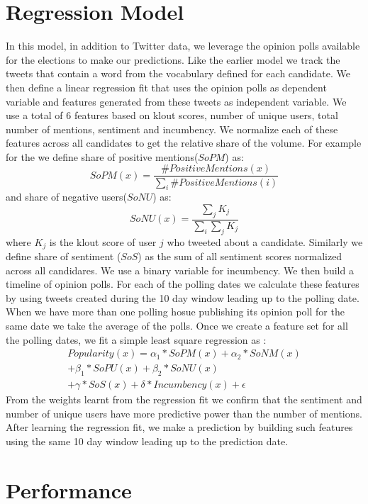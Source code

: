 \section{Regression Model}
In this model, in addition to Twitter data, we leverage the opinion polls available for the elections to make our predictions.
Like the earlier model we track the tweets that contain a word from the vocabulary defined for each candidate.
We then define a linear regression fit that uses the opinion polls as dependent variable and features generated from these tweets as independent variable.
We use a total of 6 features based on klout scores, number of unique users, total number of mentions, sentiment and incumbency.
We normalize each of these features across all candidates to get the relative share of the volume. 
For example for the we define share of positive mentions($SoPM$)  as: 
\begin{equation}
SoPM(x) = \frac{\#PositiveMentions(x)}{\sum_i \#PositiveMentions(i)} 
\end{equation}
and share of negative users($SoNU$) as:
\begin{equation}
SoNU(x) = \frac{\sum_j K_j}{\sum_i \sum_j K_j}
\end{equation}
where $K_j$ is the klout score of user $j$ who tweeted about a candidate.
Similarly we define share of sentiment ($SoS$) as the sum of all sentiment scores normalized across all candidares. 
We use a binary variable for incumbency. 
We then build a timeline of opinion polls. 
For each of the polling dates we calculate these features by using tweets created during the 10 day window leading up to the polling date.
When we have more than one polling hosue publishing its opinion poll for the same date we take the average of the polls. 
Once we create a feature set for all the polling dates, we fit a simple least square regression as :
\begin{equation}
\begin{split}
Popularity(x) = \alpha_1 * SoPM(x) + \alpha_2 * SoNM(x) \\
						 + \beta_1 * SoPU(x) + \beta_2 * SoNU(x) \\
						 + \gamma * SoS(x) + \delta * Incumbency(x) + \epsilon
\end{split}
\end{equation}
From the  weights learnt from the regression fit we confirm that the sentiment and number of unique users have more predictive power than the number of mentions.	
After learning the regression fit, we make a prediction by building such features using the same 10 day window leading up to the prediction date.

\section{Performance}

